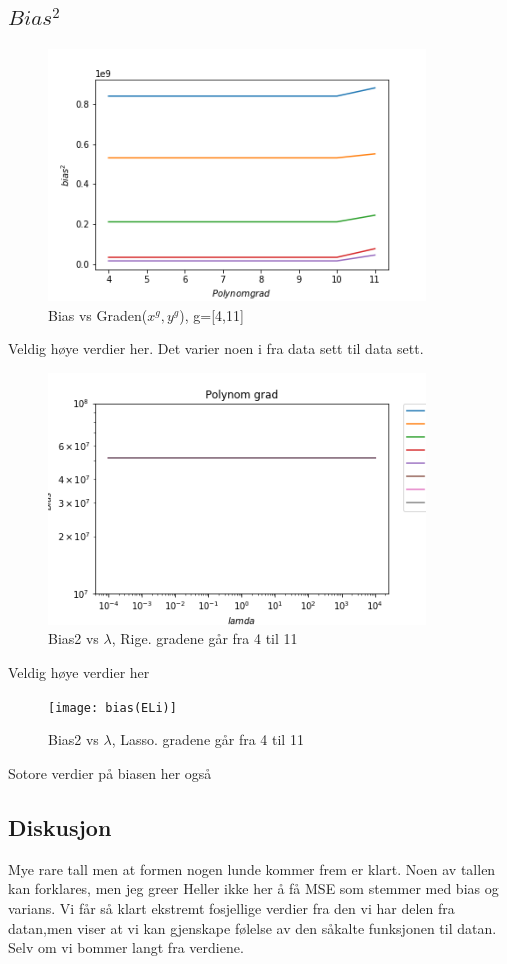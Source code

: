 \documentclass[norsk,a4paper,12pt]{article}
\begin{document}
\subsection*{$Bias^2$}
\begin{figure}[H]
\includegraphics[width=100mm]{biasE_OLS}
\caption{Bias vs Graden($x^{g},y^{g}$), g=[4,11] }
\end{figure}
Veldig høye verdier her. Det varier noen i fra data sett til data sett.

\begin{figure}[H]
\includegraphics[width=100mm]{bias(ERi)}
\caption{Bias2 vs $\lambda$, Rige. gradene går fra 4 til 11  }
\end{figure}
Veldig høye verdier her
\begin{figure}[H]
\texttt{[image: bias(ELi)]}
\caption{Bias2 vs $\lambda$, Lasso. gradene går fra 4 til 11   }
\end{figure}
Sotore verdier på biasen her også
\subsection*{Diskusjon}
Mye rare tall men at formen nogen lunde kommer frem er klart. Noen av tallen kan forklares, men jeg greer Heller ikke her å få MSE som stemmer med bias og varians. Vi får så klart ekstremt fosjellige verdier fra den vi har delen fra datan,men viser at vi kan gjenskape følelse av  den såkalte funksjonen til datan. Selv om vi bommer langt fra verdiene.
\end{document}
